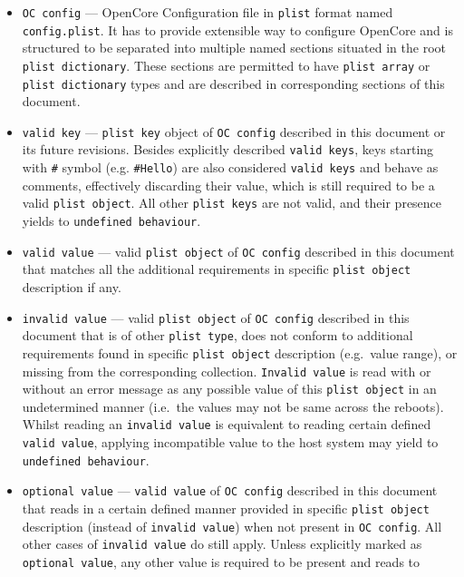 \documentclass[]{article}
\begin{document}
\begin{itemize}
\item
  \texttt{OC\ config} --- OpenCore Configuration file in \texttt{plist}
  format named \texttt{config.plist}. It has to provide extensible way
  to configure OpenCore and is structured to be separated into multiple
  named sections situated in the root \texttt{plist\ dictionary}. These
  sections are permitted to have \texttt{plist\ array} or
  \texttt{plist\ dictionary} types and are described in corresponding
  sections of this document.
\item
  \texttt{valid\ key} --- \texttt{plist\ key} object of
  \texttt{OC\ config} described in this document or its future
  revisions. Besides explicitly described \texttt{valid\ keys}, keys
  starting with \texttt{\#} symbol (e.g. \texttt{\#Hello}) are also
  considered \texttt{valid\ keys} and behave as comments, effectively
  discarding their value, which is still required to be a valid
  \texttt{plist\ object}. All other \texttt{plist\ keys} are not valid,
  and their presence yields to \texttt{undefined\ behaviour}.
\item
  \texttt{valid\ value} --- valid \texttt{plist\ object} of
  \texttt{OC\ config} described in this document that matches all the
  additional requirements in specific \texttt{plist\ object} description
  if any.
\item
  \texttt{invalid\ value} --- valid \texttt{plist\ object} of
  \texttt{OC\ config} described in this document that is of other
  \texttt{plist\ type}, does not conform to additional requirements
  found in specific \texttt{plist\ object} description (e.g.~value
  range), or missing from the corresponding collection.
  \texttt{Invalid\ value} is read with or without an error message as
  any possible value of this \texttt{plist\ object} in an undetermined
  manner (i.e.~the values may not be same across the reboots). Whilst
  reading an \texttt{invalid\ value} is equivalent to reading certain
  defined \texttt{valid\ value}, applying incompatible value to the host
  system may yield to \texttt{undefined\ behaviour}.
\item
  \texttt{optional\ value} --- \texttt{valid\ value} of
  \texttt{OC\ config} described in this document that reads in a certain
  defined manner provided in specific \texttt{plist\ object} description
  (instead of \texttt{invalid\ value}) when not present in
  \texttt{OC\ config}. All other cases of \texttt{invalid\ value} do
  still apply. Unless explicitly marked as \texttt{optional\ value}, any
  other value is required to be present and reads to

\end{itemize}
\end{document}
